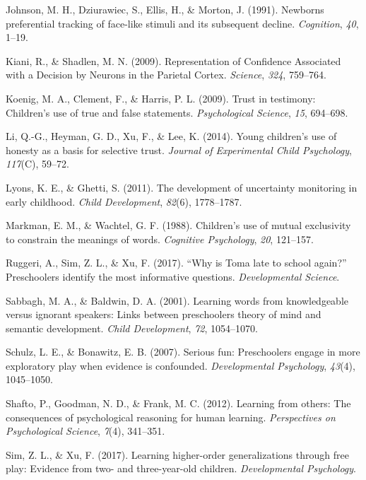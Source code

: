 \documentclass[a4paper,man,apacite,floatsintext]{apa6}
\begin{document}
\hypertarget{ref-Johnson1991}{}
Johnson, M. H., Dziurawiec, S., Ellis, H., \& Morton, J. (1991).
Newborns preferential tracking of face-like stimuli and its subsequent
decline. \emph{Cognition}, \emph{40}, 1--19.

\hypertarget{ref-Kiani2009}{}
Kiani, R., \& Shadlen, M. N. (2009). Representation of Confidence
Associated with a Decision by Neurons in the Parietal Cortex.
\emph{Science}, \emph{324}, 759--764.

\hypertarget{ref-Koenig2009}{}
Koenig, M. A., Clement, F., \& Harris, P. L. (2009). Trust in testimony:
Children's use of true and false statements. \emph{Psychological
Science}, \emph{15}, 694--698.

\hypertarget{ref-Li2014}{}
Li, Q.-G., Heyman, G. D., Xu, F., \& Lee, K. (2014). Young children's
use of honesty as a basis for selective trust. \emph{Journal of
Experimental Child Psychology}, \emph{117}(C), 59--72.

\hypertarget{ref-Lyons2011a}{}
Lyons, K. E., \& Ghetti, S. (2011). The development of uncertainty
monitoring in early childhood. \emph{Child Development}, \emph{82}(6),
1778--1787.

\hypertarget{ref-Markman1988}{}
Markman, E. M., \& Wachtel, G. F. (1988). Children's use of mutual
exclusivity to constrain the meanings of words. \emph{Cognitive
Psychology}, \emph{20}, 121--157.

\hypertarget{ref-Ruggeri2017}{}
Ruggeri, A., Sim, Z. L., \& Xu, F. (2017). ``Why is Toma late to school
again?'' Preschoolers identify the most informative questions.
\emph{Developmental Science}.

\hypertarget{ref-Sabbagh2001}{}
Sabbagh, M. A., \& Baldwin, D. A. (2001). Learning words from
knowledgeable versus ignorant speakers: Links between preschoolers
theory of mind and semantic development. \emph{Child Development},
\emph{72}, 1054--1070.

\hypertarget{ref-Schulz2007}{}
Schulz, L. E., \& Bonawitz, E. B. (2007). Serious fun: Preschoolers
engage in more exploratory play when evidence is confounded.
\emph{Developmental Psychology}, \emph{43}(4), 1045--1050.

\hypertarget{ref-Shafto2012}{}
Shafto, P., Goodman, N. D., \& Frank, M. C. (2012). Learning from
others: The consequences of psychological reasoning for human learning.
\emph{Perspectives on Psychological Science}, \emph{7}(4), 341--351.

\hypertarget{ref-Sim2017}{}
Sim, Z. L., \& Xu, F. (2017). Learning higher-order generalizations
through free play: Evidence from two- and three-year-old children.
\emph{Developmental Psychology}.
\end{document}
